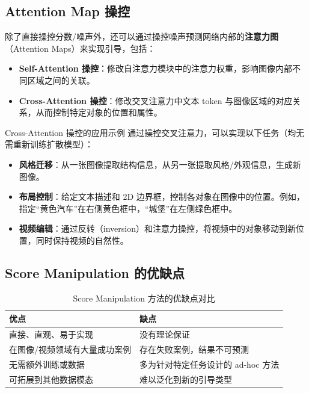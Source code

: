 \documentclass[a4paper]{article}
\begin{document}
\subsection{Attention Map 操控}

除了直接操控分数/噪声外，还可以通过操控噪声预测网络内部的\textbf{注意力图}（Attention Maps）来实现引导，包括：

\begin{itemize}
    \item \textbf{Self-Attention 操控}：修改自注意力模块中的注意力权重，影响图像内部不同区域之间的关联。
    \item \textbf{Cross-Attention 操控}：修改交叉注意力中文本 token 与图像区域的对应关系，从而控制特定对象的位置和属性。
\end{itemize}

\begin{knowledgebox}{Cross-Attention 操控的应用示例}
通过操控交叉注意力，可以实现以下任务（均无需重新训练扩散模型）：
\begin{itemize}
    \item \textbf{风格迁移}：从一张图像提取结构信息，从另一张提取风格/外观信息，生成新图像。
    \item \textbf{布局控制}：给定文本描述和 2D 边界框，控制各对象在图像中的位置。例如，指定``黄色汽车''在右侧黄色框中，``城堡''在左侧绿色框中。
    \item \textbf{视频编辑}：通过反转（inversion）和注意力操控，将视频中的对象移动到新位置，同时保持视频的自然性。
\end{itemize}
\end{knowledgebox}

\subsection{Score Manipulation 的优缺点}

\begin{table}[H]
\centering
\begin{tabular}{p{}p{}}
\toprule
\textbf{优点} & \textbf{缺点} \\
\midrule
直接、直观、易于实现 & 没有理论保证 \\
在图像/视频领域有大量成功案例 & 存在失败案例，结果不可预测 \\
无需额外训练或数据 & 多为针对特定任务设计的 ad-hoc 方法 \\
可拓展到其他数据模态 & 难以泛化到新的引导类型 \\
\bottomrule
\end{tabular}
\caption{Score Manipulation 方法的优缺点对比}
\end{table}
\end{document}
